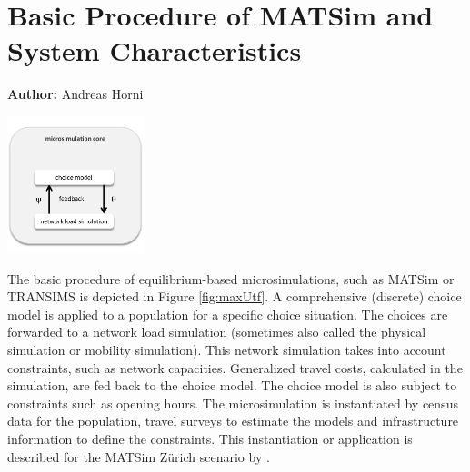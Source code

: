 \chapter{Basic Procedure of MATSim and System Characteristics}
\label{ch:basicprocedure}
\hfill \textbf{Author:} Andreas Horni 

\begin{center} \includegraphics[width=0.3\textwidth, angle=0]{understanding/figures/fixedpoint.pdf} \end{center}

The basic procedure of equilibrium-based microsimulations, such as MATSim or TRANSIMS is depicted in Figure \ref{fig:maxUtf}. A comprehensive (discrete) choice model is applied to a population for a specific choice situation. The choices are forwarded to a network load simulation (sometimes also called the physical simulation or mobility simulation). This network simulation takes into account constraints, such as network capacities. Generalized travel costs, calculated in the simulation, are fed back to the choice model. The choice model is also subject to constraints such as opening hours. The microsimulation is instantiated by census data for the population, travel surveys to estimate the models and infrastructure information to define the constraints. This instantiation or application is described for the MATSim Zürich scenario by  \citet[][]{HorniEtAl_TechRep_IVT_2011_a}. %

